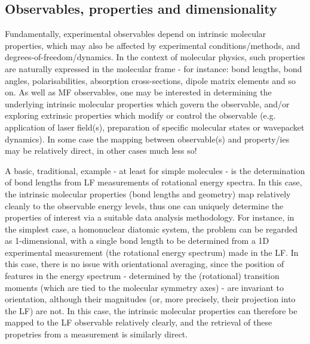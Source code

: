 \subsection{Observables, properties and dimensionality}

Fundamentally, experimental observables depend on intrinsic molecular properties, which may also be affected by experimental conditions/methods, and degrees-of-freedom/dynamics. In the  context of molecular physics, such properties are naturally expressed in the molecular frame - for instance: bond lengths, bond angles, polarisabilities, absorption cross-sections, dipole matrix elements and so on. As well as MF observables, one may be interested in determining the underlying intrinsic molecular properties which govern the observable, and/or exploring extrinsic properties which modify or control the observable (e.g. application of laser field(s), preparation of specific molecular states or wavepacket dynamics). In some case the mapping between observable(s) and property/ies may be relatively direct, in other cases much less so!

A basic, traditional, example - at least for simple molecules - is the determination of bond lengths from LF measurements of rotational energy spectra. In this case, the intrinsic molecular properties (bond lengths and geometry) map relatively cleanly to the observable energy levels, thus one can uniquely determine the properties of interest via a suitable data analysis methodology. For instance, in the simplest case, a homonuclear diatomic system, the problem can be regarded as 1-dimensional, with a single bond length to be determined from a 1D experimental measurement (the rotational energy spectrum) made in the LF. In this case, there is no issue with orientational averaging, since the position of features in the energy spectrum - determined by the (rotational) transition moments (which are tied to the molecular symmetry axes) - are invariant to orientation, although their magnitudes (or, more precisely, their projection into the LF) are not. In this case, the intrinsic molecular properties can therefore be mapped to the LF observable relatively clearly, and the retrieval of these propetries from a measurement is similarly direct.

